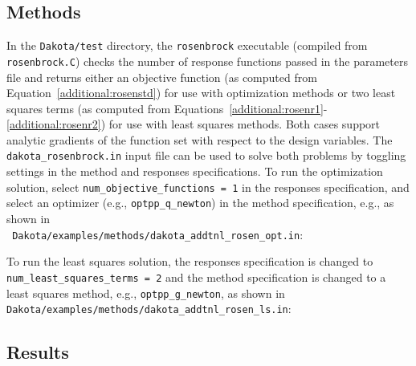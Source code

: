 \subsection{Methods}\label{additional:rosenbrock:methods}

In the \texttt{Dakota/test} directory, the \texttt{rosenbrock}
executable (compiled from \texttt{rosenbrock.C}) checks the number of
response functions passed in the parameters file and returns either an
objective function (as computed from
Equation~\ref{additional:rosenstd}) for use with optimization methods
or two least squares terms (as computed from
Equations~\ref{additional:rosenr1}-\ref{additional:rosenr2}) for use
with least squares methods.  Both cases support analytic gradients of
the function set with respect to the design variables. The
\texttt{dakota\_rosenbrock.in} input file can be used to solve both
problems by toggling settings in the method and responses
specifications. To run the optimization solution, select
\texttt{num\_objective\_functions = 1} in the responses specification,
and select an optimizer (e.g., \texttt{optpp\_q\_newton}) in the
method specification, e.g., as shown in \\ {\tt
Dakota/examples/methods/dakota\_addtnl\_rosen\_opt.in}:
\begin{center}
  \begin{small}
    \begin{bigbox}
    \end{bigbox}
  \end{small}
\end{center}

To run the least squares solution, the responses specification is
changed to \texttt{num\_least\_squares\_terms = 2} and the method
specification is changed to a least squares method, e.g.,
\texttt{optpp\_g\_newton}, as shown in {\tt
Dakota/examples/methods/dakota\_addtnl\_rosen\_ls.in}:
\begin{center}
  \begin{small}
    \begin{bigbox}
    \end{bigbox}
  \end{small}
\end{center}

\subsection{Results}\label{additional:rosenbrock:results}

